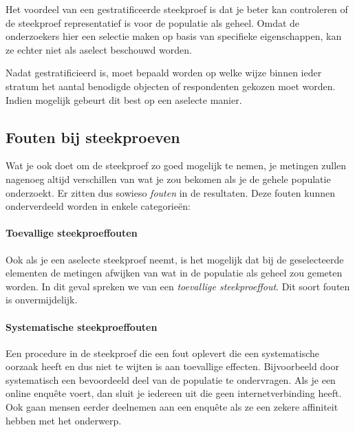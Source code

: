 Het voordeel van een gestratificeerde steekproef is dat je beter kan controleren of de steekproef representatief is voor de populatie als geheel. Omdat de onderzoekers hier een selectie maken op basis van specifieke eigenschappen, kan ze echter niet als aselect beschouwd worden.

Nadat gestratificieerd is, moet bepaald worden op welke wijze binnen ieder stratum het aantal benodigde objecten of respondenten gekozen moet worden. Indien mogelijk gebeurt dit best op een aselecte manier.



\subsection{Fouten bij steekproeven}

Wat je ook doet om de steekproef zo goed mogelijk te nemen, je metingen zullen nagenoeg altijd verschillen van wat je zou bekomen als je de gehele populatie onderzoekt. Er zitten dus sowieso \emph{fouten} in de resultaten. Deze fouten kunnen onderverdeeld worden in enkele categorieën:

\paragraph{Toevallige steekproeffouten}

Ook als je een aselecte steekproef neemt, is het mogelijk dat bij de geselecteerde elementen de metingen afwijken van wat in de populatie als geheel zou gemeten worden. In dit geval spreken we van een \emph{toevallige steekproeffout}. Dit soort fouten is onvermijdelijk.

\paragraph{Systematische steekproeffouten}

Een procedure in de steekproef die een fout oplevert die een systematische oorzaak heeft en dus niet te wijten is aan toevallige effecten. Bijvoorbeeld door systematisch een bevoordeeld deel van de populatie te ondervragen. Als je een online enquête voert, dan sluit je iedereen uit die geen internetverbinding heeft. Ook gaan mensen eerder deelnemen aan een enquête als ze een zekere affiniteit hebben met het onderwerp.

